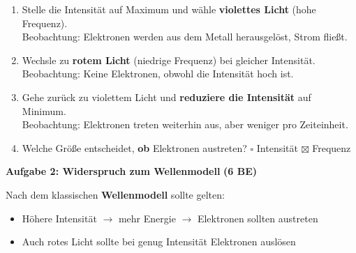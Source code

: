 \documentclass[11pt,a4paper]{article}
\begin{document}
\begin{enumerate}[label=\alph*)]
\item Stelle die Intensität auf Maximum und wähle \textbf{violettes Licht} (hohe Frequenz).\\
Beobachtung: \textcolor{loesung}{Elektronen werden aus dem Metall herausgelöst, Strom fließt.}

\vspace{0.5em}

\item Wechsle zu \textbf{rotem Licht} (niedrige Frequenz) bei gleicher Intensität.\\
Beobachtung: \textcolor{loesung}{Keine Elektronen, obwohl die Intensität hoch ist.}

\vspace{0.5em}

\item Gehe zurück zu violettem Licht und \textbf{reduziere die Intensität} auf Minimum.\\
Beobachtung: \textcolor{loesung}{Elektronen treten weiterhin aus, aber weniger pro Zeiteinheit.}

\vspace{0.5em}

\item Welche Größe entscheidet, \textbf{ob} Elektronen austreten? \hfill $\square$ Intensität \quad \textcolor{loesung}{$\boxtimes$ Frequenz}
\end{enumerate}

\vspace{0.5em}


\textbf{Aufgabe 2: Widerspruch zum Wellenmodell} \hfill \textbf{(6 BE)}

Nach dem klassischen \textbf{Wellenmodell} sollte gelten:
\begin{itemize}[nosep]
\item Höhere Intensität $\rightarrow$ mehr Energie $\rightarrow$ Elektronen sollten austreten
\item Auch rotes Licht sollte bei genug Intensität Elektronen auslösen
\end{itemize}
\end{document}
